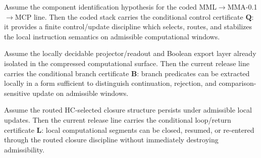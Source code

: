 \begin{proposition}
Assume the component identification hypothesis for the coded MML$\to$MMA-0.1$\to$MCP line. Then the coded stack carries the conditional control certificate $\mathbf Q$: it provides a finite control/update discipline which selects, routes, and stabilizes the local instruction semantics on admissible computational windows.
\end{proposition}

\begin{proposition}
Assume the locally decidable projector/readout and Boolean export layer already isolated in the compressed computational surface. Then the current release line carries the conditional branch certificate $\mathbf B$: branch predicates can be extracted locally in a form sufficient to distinguish continuation, rejection, and comparison-sensitive update on admissible windows.
\end{proposition}

\begin{proposition}
Assume the routed HC-selected closure structure persists under admissible local updates. Then the current release line carries the conditional loop/return certificate $\mathbf L$: local computational segments can be closed, resumed, or re-entered through the routed closure discipline without immediately destroying admissibility.
\end{proposition}

